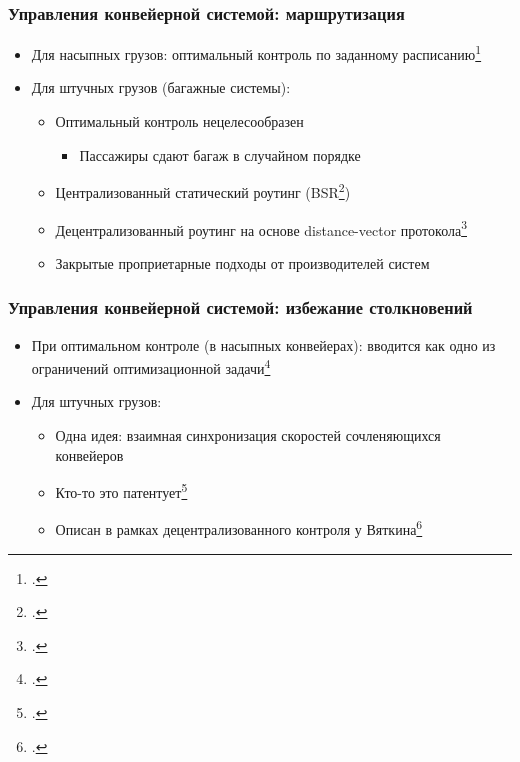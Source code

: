 \documentclass{beamer}
\begin{document}
\begin{frame}
  \frametitle{Управления конвейерной системой: маршрутизация}
  \begin{itemize}
  \item Для насыпных грузов: оптимальный контроль по заданному расписанию\footcite{ago2007simultaneous}
  \item Для штучных грузов (багажные системы):
    \begin{itemize}
    \item Оптимальный контроль нецелесообразен
      \begin{itemize}
      \item Пассажиры сдают багаж в случайном порядке
      \end{itemize} 
    \item Централизованный статический роутинг (BSR\footcite{johnstone2009status})
    \item Децентрализованный роутинг на основе distance-vector протокола\footcite{black2009intelligent}
    \item Закрытые проприетарные подходы от производителей систем
    \end{itemize} 
  \end{itemize}
\end{frame}

\begin{frame}
  \frametitle{Управления конвейерной системой: избежание столкновений}
  \begin{itemize}
  \item При оптимальном контроле (в насыпных конвейерах): вводится как одно из ограничений оптимизационной задачи\footcite{ago2007simultaneous}
  \item Для штучных грузов:
    \begin{itemize}
    \item Одна идея: взаимная синхронизация скоростей сочленяющихся конвейеров
    \item Кто-то это патентует\footcite{schafer2011material}
    \item Описан в рамках децентрализованного контроля у Вяткина\footcite{black2009intelligent}
    \end{itemize}
  \end{itemize}
\end{frame}
\end{document}
